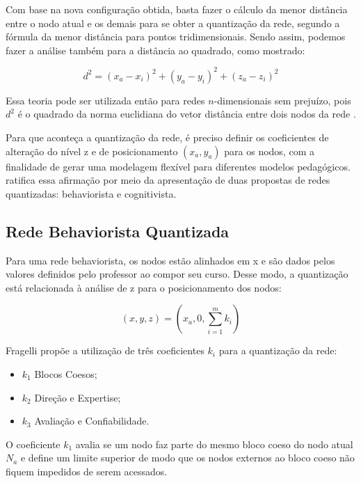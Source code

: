 Com base na nova configuração obtida, basta fazer o cálculo da menor distância entre o nodo atual e os demais para se obter a quantização da rede, segundo a fórmula da menor distância para pontos tridimensionais. Sendo assim, podemos fazer a análise também para a distância ao quadrado, como mostrado:

\begin{equation}
	d^2 = (x_a-x_i)^2 +(y_a-y_i)^2 + (z_a-z_i)^2 
\end{equation}

Essa teoria pode ser utilizada então para redes \(n\)-dimensionais sem prejuízo, pois \(d^2\) é o quadrado da norma euclidiana do vetor distância entre dois nodos da rede \cite{fragelli2010}.

Para que aconteça a quantização da rede, é preciso definir os coeficientes de alteração do nível z e de posicionamento \((x_a,y_a)\) para os nodos, com a finalidade de gerar uma modelagem flexível para diferentes modelos pedagógicos. \cite{fragelli2010} ratifica essa afirmação por meio da apresentação de duas propostas de redes quantizadas: behaviorista e cognitivista.

\subsection{Rede Behaviorista Quantizada}

Para uma rede behaviorista, os nodos estão alinhados em x e são dados pelos valores definidos pelo professor ao compor seu curso. Desse modo, a quantização está relacionada à análise de z para o posicionamento dos nodos:

\begin{equation}
	(x,y,z)=(x_a,0,\sum_{i=1}^{m} k_i ) 
\end{equation}

Fragelli propõe a utilização de três coeficientes \(k_i\) para a quantização da rede:

\begin{itemize}
	\item \(k_1\) Blocos Coesos;
 	\item \(k_2\) Direção e Expertise;
 	\item \(k_3\) Avaliação e Confiabilidade.
\end{itemize}

O coeficiente \(k_1\) avalia se um nodo faz parte do mesmo bloco coeso do nodo atual \(N_a\) e define um limite superior de modo que os nodos externos ao bloco coeso não fiquem impedidos de serem acessados.

